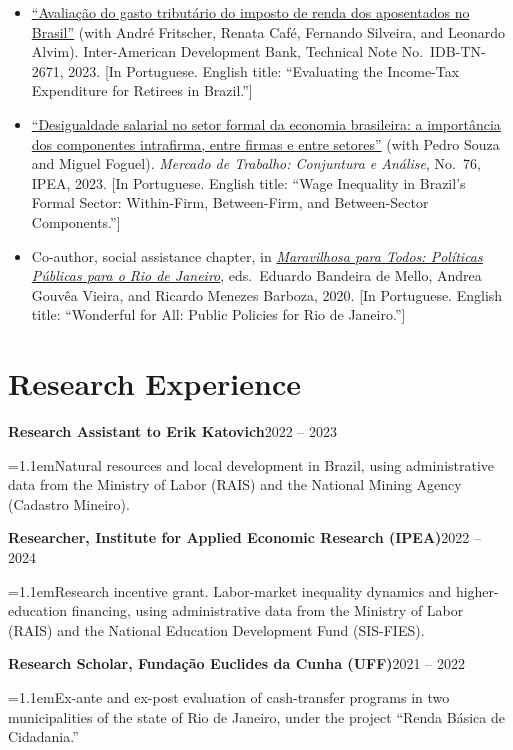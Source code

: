 \documentclass[11pt]{article}
\newcommand{\entry}[2]{\noindent\textbf{#1}\hfill #2\par}
\newcommand{\subline}[1]{{\leftskip=1.1em\noindent #1\par}}
\newenvironment{pubs}
  {\begin{itemize}[leftmargin=1.5em,labelsep=0em,label={},itemsep=6pt,parsep=0pt,topsep=2pt]
   \setlength{\itemindent}{-1.5em}}
  {\end{itemize}}
\begin{document}
\begin{pubs}
  \item \href{https://publications.iadb.org/pt/avaliacao-do-gasto-tributario-do-imposto-de-renda-dos-aposentados-no-brasil}{``Avaliação do gasto tributário do imposto de renda dos aposentados no Brasil''}
        (with André Fritscher, Renata Café, Fernando Silveira, and Leonardo Alvim).
        Inter-American Development Bank, Technical Note No.\ IDB-TN-2671, 2023.
        {\small [In Portuguese. English title: ``Evaluating the Income-Tax Expenditure for Retirees in Brazil.'']}
  \item \href{https://repositorio.ipea.gov.br/items/443efcc0-467d-4ba9-95d5-cc53eaf8654a}{``Desigualdade salarial no setor formal da economia brasileira: a importância dos componentes intrafirma, entre firmas e entre setores''}
        (with Pedro Souza and Miguel Foguel).
        \textit{Mercado de Trabalho: Conjuntura e Análise}, No.\ 76, IPEA, 2023.
        {\small [In Portuguese. English title: ``Wage Inequality in Brazil's Formal Sector:
        Within-Firm, Between-Firm, and Between-Sector Components.'']}
  \item Co-author, social assistance chapter, in
        \href{https://bandeira18.com.br/site/wp-content/uploads/2020/10/Maravilhosa_para_Todos_Politicas_para_o_Rio_de_Janeiro.pdf}{\textit{Maravilhosa para Todos: Políticas Públicas para o Rio de Janeiro}},
        eds.\ Eduardo Bandeira de Mello, Andrea Gouvêa Vieira, and Ricardo Menezes Barboza, 2020.
        {\small [In Portuguese. English title: ``Wonderful for All: Public Policies for Rio de Janeiro.'']}
\end{pubs}

\section*{Research Experience}

\entry{Research Assistant to Erik Katovich}{2022 -- 2023}
\subline{Natural resources and local development in Brazil, using administrative data from the
Ministry of Labor (RAIS) and the National Mining Agency (Cadastro Mineiro).}

\entry{Researcher, Institute for Applied Economic Research (IPEA)}{2022 -- 2024}
\subline{Research incentive grant. Labor-market inequality dynamics and higher-education financing,
using administrative data from the Ministry of Labor (RAIS) and the National Education Development
Fund (SIS-FIES).}

\entry{Research Scholar, Fundação Euclides da Cunha (UFF)}{2021 -- 2022}
\subline{Ex-ante and ex-post evaluation of cash-transfer programs in two municipalities of the state
of Rio de Janeiro, under the project ``Renda Básica de Cidadania.''}
\end{document}

